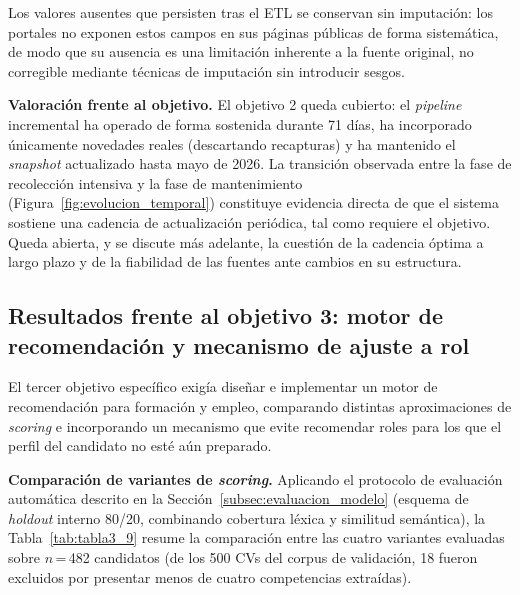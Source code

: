 Los valores ausentes que persisten tras el ETL se conservan sin imputación: los portales no exponen estos campos en sus páginas públicas de forma sistemática, de modo que su ausencia es una limitación inherente a la fuente original, no corregible mediante técnicas de imputación sin introducir sesgos.

\textbf{Valoración frente al objetivo.} El objetivo 2 queda cubierto: el \textit{pipeline} incremental ha operado de forma sostenida durante 71 días, ha incorporado únicamente novedades reales (descartando recapturas) y ha mantenido el \textit{snapshot} actualizado hasta mayo de 2026. La transición observada entre la fase de recolección intensiva y la fase de mantenimiento (Figura~\ref{fig:evolucion_temporal}) constituye evidencia directa de que el sistema sostiene una cadencia de actualización periódica, tal como requiere el objetivo. Queda abierta, y se discute más adelante, la cuestión de la cadencia óptima a largo plazo y de la fiabilidad de las fuentes ante cambios en su estructura.

\subsection{Resultados frente al objetivo 3: motor de recomendación y mecanismo de ajuste a rol}
\label{subsec:resultados_obj3}
El tercer objetivo específico exigía diseñar e implementar un motor de recomendación para formación y empleo, comparando distintas aproximaciones de \textit{scoring} e incorporando un mecanismo que evite recomendar roles para los que el perfil del candidato no esté aún preparado.

\textbf{Comparación de variantes de \textit{scoring}.} Aplicando el protocolo de evaluación automática descrito en la Sección~\ref{subsec:evaluacion_modelo} (esquema de \textit{holdout} interno 80/20, combinando cobertura léxica y similitud semántica), la Tabla~\ref{tab:tabla3_9} resume la comparación entre las cuatro variantes evaluadas sobre $n$\,=\,482 candidatos (de los 500 CVs del corpus de validación, 18 fueron excluidos por presentar menos de cuatro competencias extraídas).

